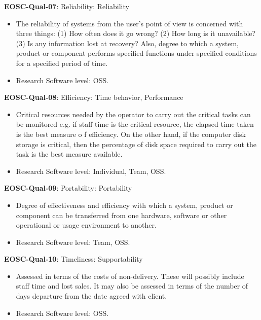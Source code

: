 \textbf{EOSC-Qual-07}: Reliability: Reliability

\begin{itemize}
    \item The reliability of systems from the user's point of view is concerned with three things: (1) How often does it go wrong? (2) How long is it unavailable? (3) Is any information lost at recovery? Also, degree to which a system, product or component performs specified functions under specified conditions for a
specified period of time. \cite{iso_25010_2011_2017,gillies_modelling_1992,boehm_quantitative_1976}
    \item Research Software level: OSS.
\end{itemize}

\textbf{EOSC-Qual-08}: Efficiency: Time behavior, Performance

\begin{itemize}
    \item Critical resources needed by the operator to carry out the critical tasks can be monitored e.g. if staff time is the critical resource, the elapsed time taken is the best measure o f efficiency. On the other hand, if the computer disk storage is critical, then the percentage of disk space required to carry out the task is the best measure available. \cite{iso_25010_2011_2017,gillies_modelling_1992,boehm_quantitative_1976}
    \item Research Software level: Individual, Team, OSS.
\end{itemize}

\textbf{EOSC-Qual-09}: Portability: Portability

\begin{itemize}
    \item Degree of effectiveness and efficiency with which a system, product or component can be transferred from one hardware, software or other operational or usage environment to another. \cite{iso_25010_2011_2017,gillies_modelling_1992,boehm_quantitative_1976,shepherdson_cessda_2019,raymond_software_2013}
    \item Research Software level: Team, OSS.
\end{itemize}

\textbf{EOSC-Qual-10}: Timeliness: Supportability

\begin{itemize}
    \item Assessed in terms of the costs of non-delivery. These will possibly include staff time and lost sales. It may also be assessed in terms of the number of days departure from the date agreed with client. \cite{gillies_modelling_1992}
    \item Research Software level: OSS.
\end{itemize}

